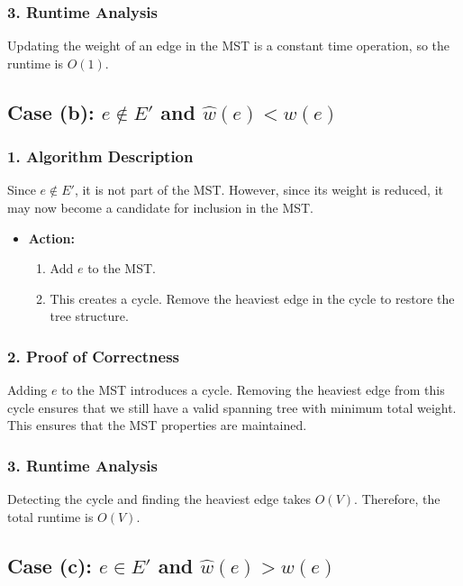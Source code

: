 \documentclass[11pt]{article}
\begin{document}
\subsubsection*{3. Runtime Analysis}
Updating the weight of an edge in the MST is a constant time operation, so the runtime is \( O(1) \).

\subsection*{Case (b): \( e \notin E' \) and \( \hat{w}(e) < w(e) \)}

\subsubsection*{1. Algorithm Description}
Since \( e \notin E' \), it is not part of the MST. However, since its weight is reduced, it may now become a candidate for inclusion in the MST.
\begin{itemize}
    \item \textbf{Action:}
    \begin{enumerate}
        \item Add \( e \) to the MST.
        \item This creates a cycle. Remove the heaviest edge in the cycle to restore the tree structure.
    \end{enumerate}
\end{itemize}

\subsubsection*{2. Proof of Correctness}
Adding \( e \) to the MST introduces a cycle. Removing the heaviest edge from this cycle ensures that we still have a valid spanning tree with minimum total weight. This ensures that the MST properties are maintained.

\subsubsection*{3. Runtime Analysis}
Detecting the cycle and finding the heaviest edge takes \( O(V) \). Therefore, the total runtime is \( O(V) \).

\subsection*{Case (c): \( e \in E' \) and \( \hat{w}(e) > w(e) \)}
\end{document}
